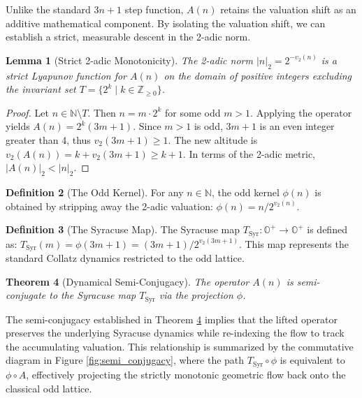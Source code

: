 \documentclass[11pt, a4paper]{article}
\newtheorem{theorem}{Theorem}[section]
\newtheorem{lemma}[theorem]{Lemma}
\theoremstyle{definition}
\newtheorem{definition}[theorem]{Definition}
\begin{document}
Unlike the standard $3n+1$ step function, $A(n)$ retains the valuation shift as an additive mathematical component. By isolating the valuation shift, we can establish a strict, measurable descent in the 2-adic norm.

\begin{lemma}[Strict 2-adic Monotonicity]
\label{lem:monotone}
The 2-adic norm $|n|_{2}=2^{-v_{2}(n)}$ is a strict Lyapunov function for $A(n)$ on the domain of positive integers excluding the invariant set $T = \{2^k \mid k \in \mathbb{Z}_{\ge 0}\}$.
\end{lemma}

\begin{proof}
Let $n \in \mathbb{N} \setminus T$. Then $n = m \cdot 2^{k}$ for some odd $m > 1$. Applying the operator yields $A(n)=2^{k}(3m+1)$. Since $m>1$ is odd, $3m+1$ is an even integer greater than 4, thus $v_{2}(3m+1)\ge1$. The new altitude is $v_{2}(A(n))=k+v_{2}(3m+1)\ge k+1$. In terms of the 2-adic metric, $|A(n)|_{2} < |n|_{2}$.
\end{proof}

\begin{definition}[The Odd Kernel]
For any $n\in\mathbb{N}$, the odd kernel $\phi(n)$ is obtained by stripping away the 2-adic valuation:
$\phi(n)=n/2^{v_{2}(n)}$.
\end{definition}

\begin{definition}[The Syracuse Map]
The Syracuse map $T_{\text{Syr}} : \mathbb{O}^{+} \rightarrow \mathbb{O}^{+}$ is defined as:
$T_{\text{Syr}}(m) = \phi(3m+1) = (3m+1)/2^{v_2(3m+1)}$.
This map represents the standard Collatz dynamics restricted to the odd lattice.
\end{definition}

\begin{theorem}[Dynamical Semi-Conjugacy]
\label{thm:semi_conjugacy}
The operator $A(n)$ is semi-conjugate to the Syracuse map $T_{\text{Syr}}$ via the projection $\phi$.
\end{theorem}

The semi-conjugacy established in Theorem \ref{thm:semi_conjugacy} implies that the lifted operator preserves the underlying Syracuse dynamics while re-indexing the flow to track the accumulating valuation. This relationship is summarized by the commutative diagram in Figure \ref{fig:semi_conjugacy}, where the path $T_{\text{Syr}} \circ \phi$ is equivalent to $\phi \circ A$, effectively projecting the strictly monotonic geometric flow back onto the classical odd lattice.
\end{document}
